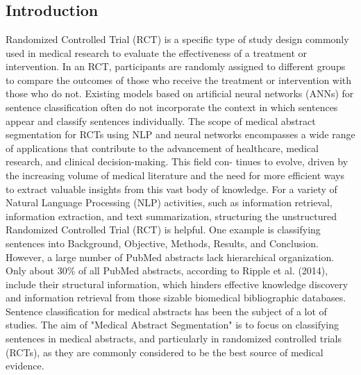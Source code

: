 \documentclass[12pt,a4paper]{report}     %
\begin{document}
\chapter{}
\begin{normalsize}
			\noindent

\section{Introduction} 	
{\setlength{\baselineskip}{1.1\baselineskip}
Randomized Controlled Trial (RCT) is a specific type of study design commonly used in medical research to evaluate the effectiveness of a treatment or intervention. In an RCT, participants are randomly assigned to different groups to compare the outcomes of those who receive the treatment or intervention with those who do not. Existing models based on artificial neural networks (ANNs) for sentence classification often do not incorporate the context in which sentences appear and classify sentences individually.
The scope of medical abstract segmentation for RCTs using NLP and neural networks encompasses a wide range of applications that contribute to the advancement of healthcare, medical research, and clinical decision-making. This field con- tinues to evolve, driven by the increasing volume of medical literature and the need for more efficient ways to extract valuable insights from this vast body of knowledge.
For a variety of Natural Language Processing (NLP) activities, such as information retrieval, information extraction, and text summarization, structuring the unstructured Randomized Controlled Trial (RCT) is helpful. One example is classifying sentences into Background, Objective, Methods, Results, and Conclusion. However, a large number of PubMed abstracts lack hierarchical organization. Only about 30\% of all PubMed abstracts, according to Ripple et al. (2014), include their structural information, which hinders effective knowledge discovery and information retrieval from those sizable biomedical bibliographic databases. Sentence classification for medical abstracts has been the subject of a lot of studies.
The aim of "Medical Abstract Segmentation" is to focus on classifying sentences in medical abstracts, and particularly in randomized controlled trials (RCTs), as they are commonly considered to be the best source of medical evidence. 
\par
}	

\end{normalsize}
\end{document}
